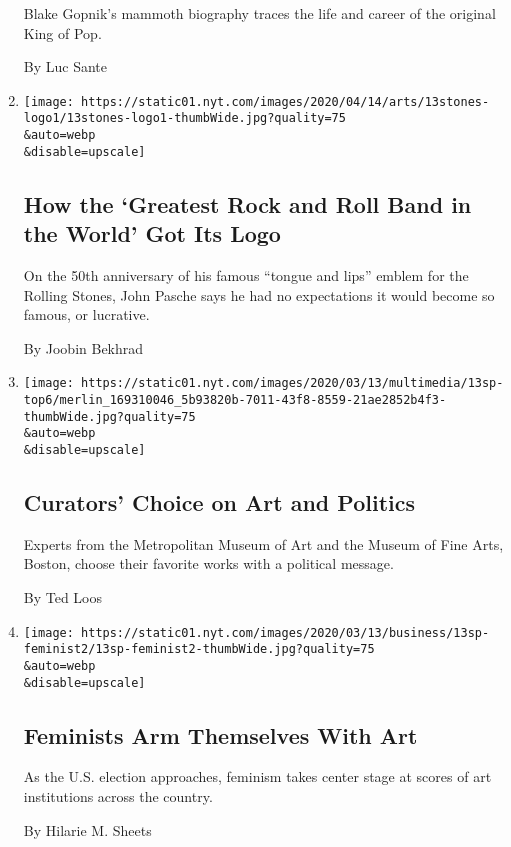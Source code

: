 \begin{enumerate}
  Blake Gopnik's mammoth biography traces the life and career of the
  original King of Pop.

  By Luc Sante
\item
  \href{/2020/04/13/arts/design/rolling-stones-logo-anniversary.html}{}

  \texttt{[image: https://static01.nyt.com/images/2020/04/14/arts/13stones-logo1/13stones-logo1-thumbWide.jpg?quality=75\\\&auto=webp\\\&disable=upscale]}

  \hypertarget{how-the-greatest-rock-and-roll-band-in-the-world-got-its-logo}{%
  \subsection{How the `Greatest Rock and Roll Band in the World' Got Its
  Logo}\label{how-the-greatest-rock-and-roll-band-in-the-world-got-its-logo}}

  On the 50th anniversary of his famous ``tongue and lips'' emblem for
  the Rolling Stones, John Pasche says he had no expectations it would
  become so famous, or lucrative.

  By Joobin Bekhrad
\item
  \href{/2020/03/09/arts/curators-top-works-political-art.html}{}

  \texttt{[image: https://static01.nyt.com/images/2020/03/13/multimedia/13sp-top6/merlin\_169310046\_5b93820b-7011-43f8-8559-21ae2852b4f3-thumbWide.jpg?quality=75\\\&auto=webp\\\&disable=upscale]}

  \hypertarget{curators-choice-on-art-and-politics}{%
  \subsection{Curators' Choice on Art and
  Politics}\label{curators-choice-on-art-and-politics}}

  Experts from the Metropolitan Museum of Art and the Museum of Fine
  Arts, Boston, choose their favorite works with a political message.

  By Ted Loos
\item
  \href{/2020/03/08/arts/feminism-art-us-election.html}{}

  \texttt{[image: https://static01.nyt.com/images/2020/03/13/business/13sp-feminist2/13sp-feminist2-thumbWide.jpg?quality=75\\\&auto=webp\\\&disable=upscale]}

  \hypertarget{feminists-arm-themselves-with-art}{%
  \subsection{Feminists Arm Themselves With
  Art}\label{feminists-arm-themselves-with-art}}

  As the U.S. election approaches, feminism takes center stage at scores
  of art institutions across the country.

  By Hilarie M. Sheets
\end{enumerate}

